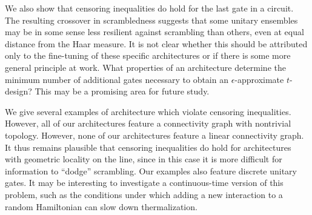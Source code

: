 \documentclass[aps,prx,floatfix,nofootinbib,superscriptaddress,longbibliography]{revtex4-2}
\begin{document}
We also show that censoring inequalities do hold for the last gate in a circuit. The resulting crossover in scrambledness suggests that some unitary ensembles may be in some sense less resilient against scrambling than others, even at equal distance from the Haar measure. It is not clear whether this should be attributed only to the fine-tuning of these specific architectures or if there is some more general principle at work. What properties of an architecture determine the minimum number of additional gates necessary to obtain an $\epsilon$-approximate $t$-design? This may be a promising area for future study.

We give several examples of architecture which violate censoring inequalities. However, all of our architectures feature a connectivity graph with nontrivial topology. However, none of our architectures feature a linear connectivity graph. It thus remains plausible that censoring inequalities do hold for architectures with geometric locality on the line, since in this case it is more difficult for information to ``dodge'' scrambling.  Our examples also feature discrete unitary gates. It may be interesting to investigate a continuous-time version of this problem, such as the conditions under which adding a new interaction to a random Hamiltonian can slow down thermalization. 




\end{document}
